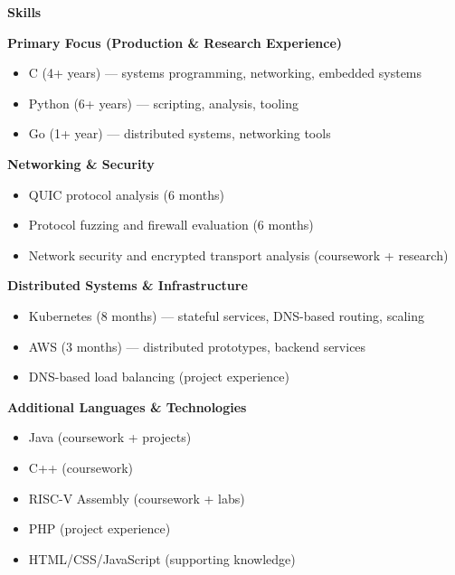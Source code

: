 \documentclass[11pt]{article}
\begin{document}
\vspace{10pt}

\textbf{\large Skills}

\vspace{4pt}

\textbf{Primary Focus (Production \& Research Experience)}

\begin{itemize}[leftmargin=*]
\item C (4+ years) --- systems programming, networking, embedded systems
\item Python (6+ years) --- scripting, analysis, tooling
\item Go (1+ year) --- distributed systems, networking tools
\end{itemize}

\textbf{Networking \& Security}

\begin{itemize}[leftmargin=*]
\item QUIC protocol analysis (6 months)
\item Protocol fuzzing and firewall evaluation (6 months)
\item Network security and encrypted transport analysis (coursework + research)
\end{itemize}

\textbf{Distributed Systems \& Infrastructure}

\begin{itemize}[leftmargin=*]
\item Kubernetes (8 months) --- stateful services, DNS-based routing, scaling
\item AWS (3 months) --- distributed prototypes, backend services
\item DNS-based load balancing (project experience)
\end{itemize}

\textbf{Additional Languages \& Technologies}

\begin{itemize}[leftmargin=*]
\item Java (coursework + projects)
\item C++ (coursework)
\item RISC-V Assembly (coursework + labs)
\item PHP (project experience)
\item HTML/CSS/JavaScript (supporting knowledge)
\end{itemize}
\end{document}
